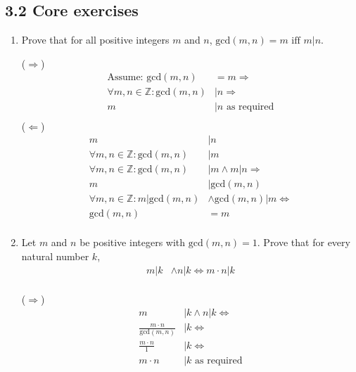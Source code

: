 \documentclass[10pt,\jkfside,a4paper]{article}
\begin{document}
\subsection*{3.2 Core exercises}

\begin{enumerate}

\item Prove that for all positive integers $m$ and $n$, $\text{gcd}(m, n) = m \text{ iff } m|n$.

($\Longrightarrow$)
\begin{equation}
\begin{split}
\text{Assume: }\text{gcd}(m, n) &= m\Longrightarrow\\
\forall m, n \in \mathbb{Z}: \text{gcd}(m, n) &| n\Longrightarrow\\
m &| n\text{ as required}\\
\end{split}
\end{equation}
($\Longleftarrow$)
\begin{equation}
\begin{split}
m &| n\\
\forall m, n \in \mathbb{Z}: \text{gcd}(m, n) &| m\\
\forall m, n \in \mathbb{Z}: \text{gcd}(m, n) &| m \wedge m | n\Longrightarrow\\
m &| \text{gcd}(m, n)\\
\forall m, n \in \mathbb{Z}: m | \text{gcd}(m, n) &\wedge \text{gcd}(m, n) | m \Longleftrightarrow\\
\text{gcd}(m, n) &= m\\
\end{split}
\end{equation}

\item Let $m$ and $n$ be positive integers with $\text{gcd}(m, n) = 1$. Prove that for every natural number 
$k$,
\begin{equation*}
\begin{split}
m | k &\wedge n | k \Longleftrightarrow m\cdot n | k\\
\end{split}
\end{equation*}

($\Longrightarrow$)
\begin{equation}
\begin{split}
m &| k \wedge n | k \Longleftrightarrow\\
\frac{m\cdot n}{\text{gcd}(m, n)} &| k\Longleftrightarrow\\
\frac{m\cdot n}{1} &| k\Longleftrightarrow\\
m\cdot n &| k\text{ as required}\\
\end{split}
\end{equation}


\end{enumerate}
\end{document}
